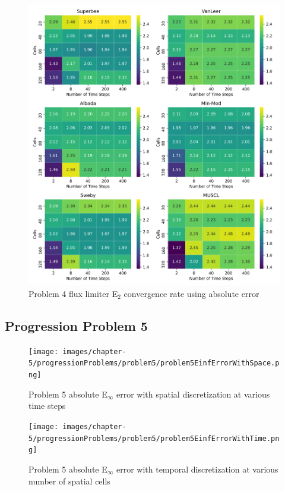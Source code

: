 \clearpage

\begin{figure}[p]
    \centering
    \includegraphics[width=6in]{images/chapter-5/progressionProblems/problem4/problem4E2FluxLimiterConvergenceRate.png}
    \caption{Problem 4 flux limiter E${}_{2}$ convergence rate using absolute error}
    \label{fig:problem4_l2error_fluxlimiter_convergence_rate}
\end{figure}

\clearpage

\subsection{Progression Problem 5}
\begin{figure}[p]
    \centering
    \texttt{[image: images/chapter-5/progressionProblems/problem5/problem5EinfErrorWithSpace.png]}
    \caption{Problem 5 absolute E${}_{\infty}$ error with spatial discretization at various time steps }
    \label{fig:problem5_linferror_spatial_results}
\end{figure}

\clearpage

\begin{figure}[p]
    \centering
    \texttt{[image: images/chapter-5/progressionProblems/problem5/problem5EinfErrorWithTime.png]}
    \caption{Problem 5 absolute E${}_{\infty}$ error with temporal discretization at various number of spatial cells}
    \label{fig:problem5_linferror_time_results}
\end{figure}


